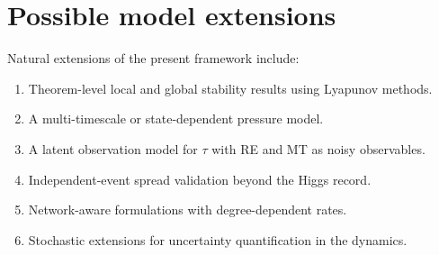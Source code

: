 \documentclass[11pt]{article}
\begin{document}
\section{Possible model extensions}
\label{app:extensions}

Natural extensions of the present framework include:
\begin{enumerate}[leftmargin=1.5em]
    \item Theorem-level local and global stability results using Lyapunov methods.
    \item A multi-timescale or state-dependent pressure model.
    \item A latent observation model for $\tau$ with RE and MT as noisy observables.
    \item Independent-event spread validation beyond the Higgs record.
    \item Network-aware formulations with degree-dependent rates.
    \item Stochastic extensions for uncertainty quantification in the dynamics.
\end{enumerate}
\end{document}
